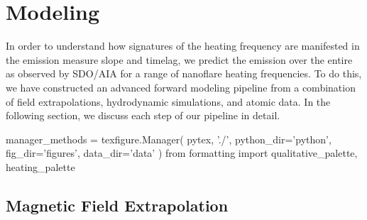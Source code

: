 \section{Modeling}\label{modeling}

In order to understand how signatures of the heating frequency are manifested in the emission measure slope and timelag, we predict the emission over the entire \AR{} as observed by SDO/AIA for a range of nanoflare heating frequencies. To do this, we have constructed an advanced forward modeling pipeline from a combination of field extrapolations, hydrodynamic simulations, and atomic data. In the following section, we discuss each step of our pipeline in detail.

\begin{pycode}
manager_methods = texfigure.Manager(
    pytex, './',
    python_dir='python',
    fig_dir='figures',
    data_dir='data'
)
from formatting import qualitative_palette, heating_palette
\end{pycode}

\subsection{Magnetic Field Extrapolation}\label{field}


